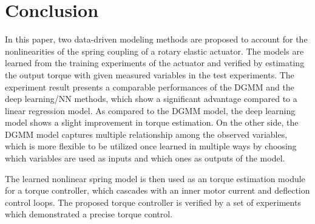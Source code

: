 \section{Conclusion}
\label{sec:Conclusion}
In this paper, two data-driven modeling methods are proposed to account for the nonlinearities of the spring coupling of a rotary elastic actuator. The models are learned from the training experiments of the actuator and verified by estimating the output torque with given measured variables in the test experiments. The experiment result presents a comparable performances of the DGMM and the deep learning/NN methods, which show a significant advantage compared to a linear regression model. As compared to the DGMM model, the deep learning model shows a slight improvement in torque estimation. On the other side, the DGMM model captures multiple relationship among the observed variables, which is more flexible to be utilized once learned in multiple ways by choosing which variables are used as inputs and which ones as outputs of the model.

The learned nonlinear spring model is then used as an torque estimation module for a torque controller, which cascades with  an inner motor current and deflection control loops. The proposed torque controller is verified by a set of experiments which demonstrated a precise torque control. 

